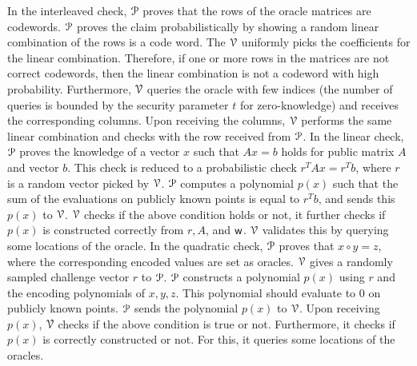 In the interleaved check, $\mathcal{P}$ proves that the rows of the oracle matrices are codewords. $\mathcal{P}$ proves the claim probabilistically by showing a random linear combination of the rows is a code word. The $\mathcal{V}$ uniformly picks the coefficients for the linear combination.
Therefore, if one or more rows in the matrices are not correct codewords, then the linear combination is not a codeword with high probability. Furthermore, $\mathcal{V}$ queries the oracle with few indices (the number of queries is bounded by the security parameter $t$ for zero-knowledge) and receives the corresponding columns. Upon receiving the columns, $\mathcal{V}$ performs the same linear combination and checks with the row received from $\mathcal{P}$.
In the linear check, $\mathcal{P}$ proves the knowledge of a vector $x$ such that $Ax = b$ holds for public matrix $A$ and vector $b$. This check is reduced to a probabilistic check $r^TAx = r^T b$, where $r$ is a random vector picked by $\mathcal{V}$. $\mathcal{P}$ computes a polynomial $p(x)$ such that the sum of the evaluations on publicly known points is equal to $r^Tb$, and sends this $p(x)$ to $\mathcal{V}$. $\mathcal{V}$ checks if the above condition holds or not, it further checks if $p(x)$ is constructed correctly from $r, A$, and $\mathsf{w}$. $\mathcal{V}$ validates this by querying some locations of the oracle.
In the quadratic check, $\mathcal{P}$ proves that $x \circ y = z$, where the corresponding encoded values are set as oracles. $\mathcal{V}$ gives a randomly sampled challenge vector $r$ to $\mathcal{P}$. $\mathcal{P}$ constructs a polynomial $p(x)$ using $r$ and the encoding polynomials of $x, y, z$. This polynomial should evaluate to $0$ on publicly known points. $\mathcal{P}$ sends the polynomial $p(x)$ to $\mathcal{V}$. Upon receiving $p(x)$, $\mathcal{V}$ checks if the above condition is true or not. Furthermore, it checks if $p(x)$ is correctly constructed or not. For this, it queries some locations of the oracles.


